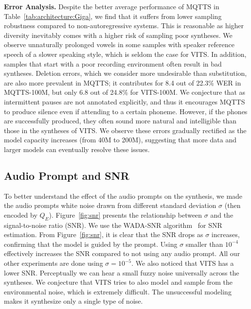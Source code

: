 \documentclass[letterpaper]{article} %
\begin{document}
\textbf{Error Analysis.}
Despite the better average performance of MQTTS in Table~\ref{tab:architecture:Giga}, we find that it suffers from lower sampling robustness compared to non-autoregressive systems.
This is reasonable as higher diversity inevitably comes with a higher risk of sampling poor syntheses.
We observe unnaturally prolonged vowels in some samples with speaker reference speech of a slower speaking style, which is seldom the case for VITS.
In addition, samples that start with a poor recording environment often result in bad syntheses.
Deletion errors, which we consider more undesirable than substitution, are also more prevalent in MQTTS; it contributes for 8.4 out of 22.3\% WER in MQTTS-100M, but only 6.8 out of 24.8\% for VITS-100M.
We conjecture that as intermittent pauses are not annotated explicitly, and thus it encourages MQTTS to produce silence even if attending to a certain phoneme.
However, if the phones are successfully produced, they often sound more natural and intelligible than those in the syntheses of VITS.
We observe these errors gradually rectified as the model capacity increases (from 40M to 200M), suggesting that more data and larger models can eventually resolve these issues.






\subsection{Audio Prompt and SNR}
To better understand the effect of the audio prompts on the synthesis, we made the audio prompts white noise drawn from different standard deviation $\sigma$ (then encoded by $Q_E$).
Figure~\ref{fig:snr} presents the relationship between $\sigma$ and the signal-to-noise ratio (SNR).
We use the WADA-SNR algorithm~\cite{kim08e_interspeech} for SNR estimation.
From Figure~\ref{fig:snr}, it is clear that the SNR drops as $\sigma$ increases, confirming that the model is guided by the prompt.
Using $\sigma$ smaller than $10^{-4}$  effectively increases the SNR compared to not using any audio prompt.
All our other experiments are done using $\sigma=10^{-5}$.
We also noticed that VITS has a lower SNR.
Perceptually we can hear a small fuzzy noise universally across the syntheses.
We conjecture that VITS tries to also model and sample from the environmental noise, which is extremely difficult.
The unsuccessful modeling makes it synthesize only a single type of noise.
\end{document}

